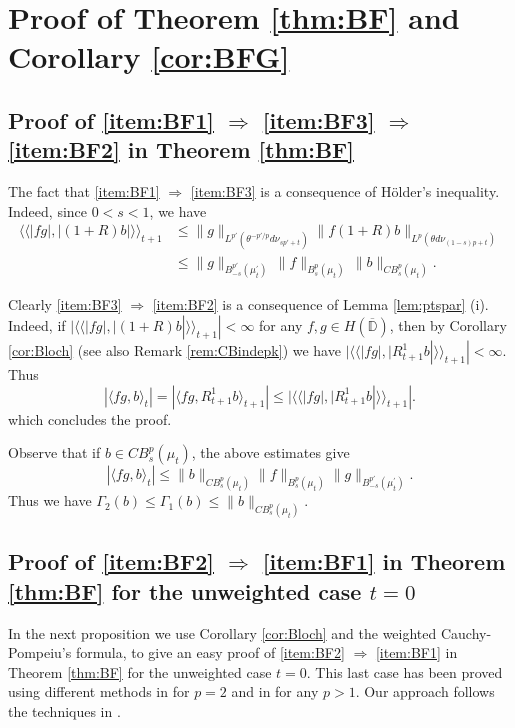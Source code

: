 \documentclass[12pt,twoside,leqno,final]{amsart}
\theoremstyle{plain}
\begin{document}
\section{Proof of Theorem \ref{thm:BF} and Corollary \ref{cor:BFG}} \label{sec:proofBF}

\subsection{Proof of \eqref{item:BF1} $\Longrightarrow$ \eqref{item:BF3} $\Longrightarrow$ \eqref{item:BF2} in Theorem \ref{thm:BF}} \quad\par

The fact that \eqref{item:BF1} $\Longrightarrow$ \eqref{item:BF3} is a consequence of H\"older's inequality.
Indeed, since $0<s<1$, we have 
\begin{align*}
\langle \langle|fg|,|(1+R)b|\rangle\rangle_{t+1}
&\le \|g\|_{L^{p'}(\theta^{-p'/p}d\nu_{sp'+t})}\|f(1+R)b\|_{L^p(\theta d\nu_{(1-s)p+t})}\\
&\le \|g\|_{B^{p'}_{-s}(\mu^\prime_t)}\,\|f\|_{B^{p}_{s}(\mu_t)}\,\|b\|_{CB^{p}_{s}(\mu_t)}.
\end{align*}

Clearly \eqref{item:BF3} $\Longrightarrow$ \eqref{item:BF2} is a consequence of Lemma \ref{lem:ptspar} (i). 
Indeed, if $|\langle\langle |fg|,|(1+R)b|\rangle\rangle_{t+1}|<\infty$ for any $f,g\in  H(\overline{{\mathbb D}})$, 
then  by Corollary \ref{cor:Bloch} (see also Remark \ref{rem:CBindepk}) we have
$|\langle\langle |fg|,|R^1_{t+1}b|\rangle\rangle_{t+1}|<\infty$.
Thus 
$$
|\langle fg,b\rangle_t|=|\langle fg,R^1_{t+1}b \rangle_{t+1}|\le |\langle\langle |fg|,|R^1_{t+1}b|\rangle\rangle_{t+1}|.
$$
which concludes the proof.

Observe that if $b\in CB^p_s(\mu_t)$, the above estimates give 
\begin{equation}\label{eqn:2implies3}
|\langle fg,b\rangle_t|\le \|b\|_{CB^{p}_{s}(\mu_t)} \|f\|_{B^{p}_{s}(\mu_t)} \|g\|_{B^{p'}_{-s}(\mu^\prime_t)}.
\end{equation}
Thus we have
$
\Gamma_2(b)\le \Gamma_1(b) \le \|b\|_{CB^{p}_{s}(\mu_t)}.
$

\subsection{Proof of \eqref{item:BF2} $\Longrightarrow$ \eqref{item:BF1}  in Theorem \ref{thm:BF} for the unweighted case $t=0$}
\quad\par
In the next proposition we use Corollary \ref{cor:Bloch} and the weighted Cauchy-Pompeiu's 
 formula, to give an easy proof of \eqref{item:BF2} $\Longrightarrow$ \eqref{item:BF1} 
 in Theorem \ref{thm:BF} for the unweighted case $t=0$. This last  
case  has been proved using different methods in \cite{Ro-Wu} for $p=2$ and in 
\cite{Bla-Pau} for any $p>1$. Our approach follows the techniques in \cite{Wu}.
\end{document}
